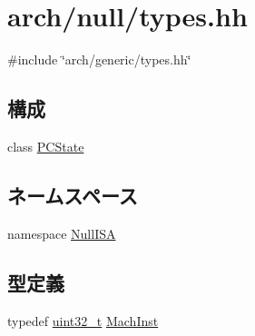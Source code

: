 \hypertarget{arch_2null_2types_8hh}{
\section{arch/null/types.hh}
\label{arch_2null_2types_8hh}
}
{\ttfamily \#include \char`\"{}arch/generic/types.hh\char`\"{}}\par
\subsection*{構成}
\begin{DoxyCompactItemize}
\item 
class \hyperlink{classNullISA_1_1PCState}{PCState}
\end{DoxyCompactItemize}
\subsection*{ネームスペース}
\begin{DoxyCompactItemize}
\item 
namespace \hyperlink{namespaceNullISA}{NullISA}
\end{DoxyCompactItemize}
\subsection*{型定義}
\begin{DoxyCompactItemize}
\item 
typedef \hyperlink{Type_8hh_a435d1572bf3f880d55459d9805097f62}{uint32\_\-t} \hyperlink{namespaceNullISA_a301c22ea09fa33dcfe6ddf22f203699c}{MachInst}
\end{DoxyCompactItemize}
